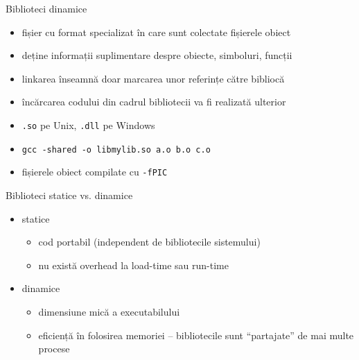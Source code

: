 \documentclass{simple}
\begin{document}
\begin{frame}{Biblioteci dinamice}
  \begin{itemize}
    \item fișier cu format specializat în care sunt colectate fișierele obiect
    \item deține informații suplimentare despre obiecte, simboluri, funcții
    \item linkarea înseamnă doar marcarea unor referințe către bibliocă
    \item încărcarea codului din cadrul bibliotecii va fi realizată ulterior
    \item \texttt{.so} pe Unix, \texttt{.dll} pe Windows
    \item \texttt{gcc -shared -o libmylib.so a.o b.o c.o}
    \item fișierele obiect compilate cu \texttt{-fPIC}
  \end{itemize}
\end{frame}

\begin{frame}{Biblioteci statice vs. dinamice}
  \begin{itemize}
    \item statice
      \begin{itemize}
        \item cod portabil (independent de bibliotecile sistemului)
        \item nu există overhead la load-time sau run-time
      \end{itemize}
    \item dinamice
      \begin{itemize}
        \item dimensiune mică a executabilului
        \item eficiență în folosirea memoriei -- bibliotecile sunt
        ``partajate'' de mai multe procese
      \end{itemize}
  \end{itemize}
\end{frame}
\end{document}
